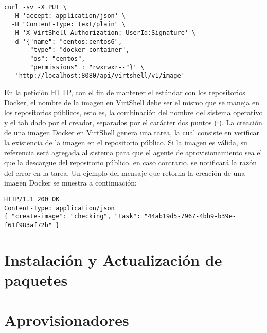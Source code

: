 \vspace{5mm}

\begin{lstlisting}[style=json, caption=Petición HTTP para crear una imagen para contenedores Docker]
curl -sv -X PUT \
  -H 'accept: application/json' \
  -H "Content-Type: text/plain" \
  -H 'X-VirtShell-Authorization: UserId:Signature' \
  -d '{"name": "centos:centos6",
       "type": "docker-container",
       "os": "centos",
       "permissions" : "rwxrwxr--"}' \
   'http://localhost:8080/api/virtshell/v1/image'
\end{lstlisting}

\vspace{5mm}

En la petición HTTP, con el fin de mantener el estándar con los repositorios Docker, el nombre de la imagen en VirtShell debe ser el mismo que se maneja en los repositorios públicos, esto es, la combinación del nombre del sistema operativo y el tab dado por el creador, separados por el carácter dos puntos (:). La creación de una imagen Docker en VirtShell genera una tarea, la cual consiste en verificar la existencia de la imagen en el repositorio público. Si la imagen es válida, su referencia será agregada al sistema para que el agente de aprovisionamiento sea el que la descargue del repositorio público, en caso contrario, se notificará la razón del error en la tarea. Un ejemplo del mensaje que retorna la creación de una imagen Docker se muestra a continuación:

\vspace{5mm}

\begin{lstlisting}[style=json, caption=Ejemplo de respuesta HTTP para la creación de una imagen]
HTTP/1.1 200 OK
Content-Type: application/json
{ "create-image": "checking", "task": "44ab19d5-7967-4bb9-b39e-f61f983af72b" }
\end{lstlisting}


\section{Instalación y Actualización de paquetes}


\section{Aprovisionadores}
